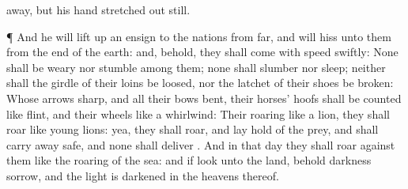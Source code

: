 {away, but his
hand
{} stretched
out still.
\par }{\PP {}¶ And he will lift
up an
ensign to the
nations from
far, and will
hiss unto them from the
end of the
earth: and, behold, they shall
come with
speed
swiftly:
None shall be
weary nor
stumble among them; none shall
slumber nor
sleep; neither shall the
girdle of their
loins be
loosed, nor the
latchet of their
shoes be
broken:
Whose
arrows
{}
sharp, and all their
bows
bent, their
horses’
hoofs shall be
counted like
flint, and their
wheels like a
whirlwind:
Their
roaring
{} like a
lion, they shall
roar like young
lions: yea, they shall
roar, and lay
hold of the
prey, and shall carry
{} away
safe, and none shall
deliver
{}.
And in that
day they shall
roar against them like the
roaring of the
sea: and if
{}
look unto the
land, behold
darkness
{}
sorrow, and the
light is
darkened in the
heavens thereof.

}

